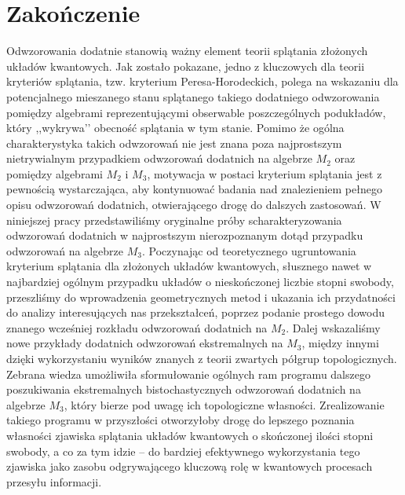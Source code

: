 \chapter*{Zakończenie}

    \label{chap:Zakończenie}

Odwzorowania dodatnie stanowią ważny element teorii splątania złożonych
układów kwantowych.
Jak zostało pokazane, jedno z kluczowych dla teorii kryteriów splątania,
tzw. kryterium Peresa-Horodeckich,
polega na wskazaniu dla potencjalnego mieszanego stanu splątanego takiego
dodatniego odwzorowania pomiędzy algebrami reprezentującymi obserwable
poszczególnych podukładów, który ,,wykrywa’’ obecność splątania w tym stanie.
Pomimo że ogólna charakterystyka takich odwzorowań nie jest znana poza
najprostszym nietrywialnym przypadkiem odwzorowań dodatnich na algebrze
$M_{2}$ oraz pomiędzy algebrami $M_{2}$ i $M_{3}$, motywacja w postaci kryterium
splątania jest z pewnością wystarczająca,
aby kontynuować badania nad znalezieniem pełnego opisu odwzorowań dodatnich,
otwierającego drogę do dalszych zastosowań.
W niniejszej pracy przedstawiliśmy oryginalne próby scharakteryzowania
odwzorowań dodatnich w najprostszym nierozpoznanym dotąd przypadku odwzorowań
na algebrze $M_{3}$.
Poczynając od teoretycznego ugruntowania kryterium splątania dla złożonych
układów kwantowych,
słusznego nawet w najbardziej ogólnym przypadku układów
o nieskończonej liczbie stopni swobody,
przeszliśmy do wprowadzenia geometrycznych metod i ukazania ich przydatności do
analizy interesujących nas przekształceń,
poprzez podanie prostego dowodu znanego wcześniej rozkładu
odwzorowań dodatnich na $M_{2}$.
Dalej wskazaliśmy nowe przykłady dodatnich odwzorowań ekstremalnych na $M_{3}$,
między innymi dzięki wykorzystaniu wyników znanych
z teorii zwartych półgrup topologicznych.
Zebrana wiedza umożliwiła sformułowanie ogólnych ram programu dalszego
poszukiwania ekstremalnych bistochastycznych odwzorowań dodatnich
na algebrze $M_{3}$,
który bierze pod uwagę ich topologiczne własności.
Zrealizowanie takiego programu w przyszłości otworzyłoby drogę do lepszego
poznania własności zjawiska splątania układów kwantowych o skończonej ilości
stopni swobody,
a co za tym idzie -- do bardziej efektywnego wykorzystania tego zjawiska jako
zasobu odgrywającego kluczową rolę w kwantowych procesach przesyłu informacji.
